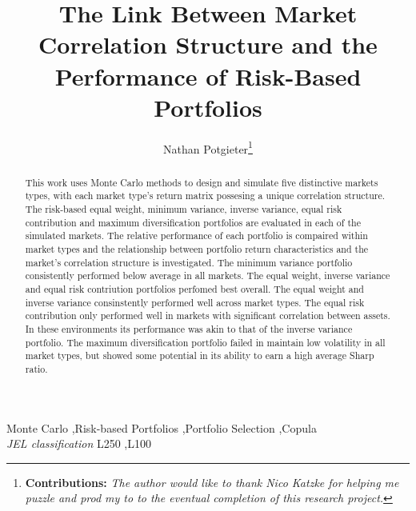 \documentclass[11pt,preprint, authoryear]{elsarticle}
\numberwithin{equation}{section}
\numberwithin{figure}{section}
\numberwithin{table}{section}
\let\rmarkdownfootnote\footnote%
\def\footnote{\protect\rmarkdownfootnote}
\begin{document}
\begin{frontmatter}  %

\title{The Link Between Market Correlation Structure and the Performance of
Risk-Based Portfolios}





\author[Add1]{Nathan Potgieter\footnote{\textbf{Contributions:} \newline \emph{The
  author would like to thank Nico Katzke for helping me puzzle and prod
  my to to the eventual completion of this research project.}}}





\address[Add1]{Stellenbosch University, Stellenbosch, South Africa}


\begin{abstract}
\small{
This work uses Monte Carlo methods to design and simulate five
distinctive markets types, with each market type's return matrix
possesing a unique correlation structure. The risk-based equal weight,
minimum variance, inverse variance, equal risk contribution and maximum
diversification portfolios are evaluated in each of the simulated
markets. The relative performance of each portfolio is compaired within
market types and the relationship between portfolio return
characteristics and the market's correlation structure is investigated.
The minimum variance portfolio consistently performed below average in
all markets. The equal weight, inverse variance and equal risk
contriution portfolios perfomed best overall. The equal weight and
inverse variance consinstently performed well across market types. The
equal risk contribution only performed well in markets with significant
correlation between assets. In these environments its performance was
akin to that of the inverse variance portfolio. The maximum
diversification portfolio failed in maintain low volatility in all
market types, but showed some potential in its ability to earn a high
average Sharp ratio.
}
\end{abstract}

\vspace{1cm}

\begin{keyword}
\footnotesize{
Monte Carlo \sep Risk-based Portfolios \sep Portfolio Selection
\sep Copula \\ \vspace{0.3cm}
\textit{JEL classification} L250 \sep L100
}
\end{keyword}
\vspace{0.5cm}
\end{frontmatter}
\end{document}
